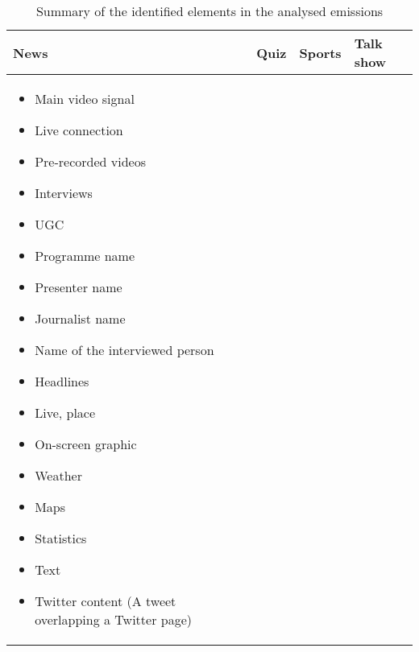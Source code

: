 \begin{table} 
	\caption {Summary of the identified elements in the analysed emissions}\label{tab:elemlist}
	\begin{tabular}{||L|L|L|L||}
		\hline
		\textbf{News} & \textbf{Quiz} & \textbf{Sports} & \textbf{Talk show} \\
		\hline   
		\begin{itemize}[leftmargin=.1in]
			\setlength{\itemsep}{-0.3\baselineskip}
			\item Main video signal
			\item Live connection 
			\item Pre-recorded videos 
			\item Interviews 
			\item UGC 
			\item Programme name 
			\item Presenter name 
			\item Journalist name 
			\item Name of the interviewed person 
			\item Headlines 
			\item Live, place 
			\item On-screen graphic 
			\item Weather   
			\item Maps
			\item Statistics
			\item Text       
			\item Twitter content (A tweet overlapping a Twitter page)
			

\end{itemize}
\end{tabular}
\end{table}
